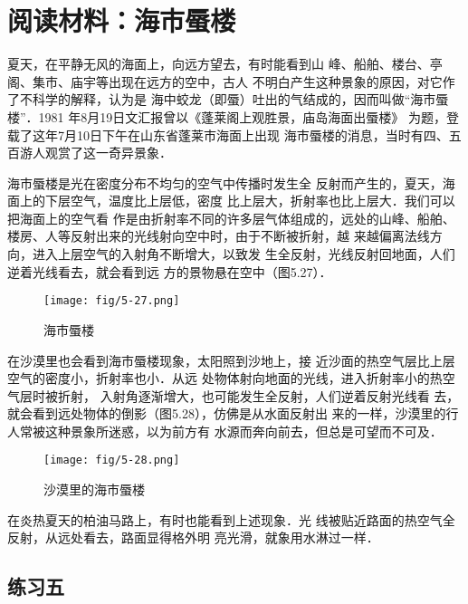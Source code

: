 \section*{阅读材料：海市蜃楼}

夏天，在平静无风的海面上，向远方望去，有时能看到山
峰、船舶、楼台、亭阁、集市、庙宇等出现在远方的空中，古人
不明白产生这种景象的原因，对它作了不科学的解释，认为是
海中蛟龙（即蜃）吐出的气结成的，因而叫做“海市蜃楼”．1981
年8月19日文汇报曾以《蓬莱阁上观胜景，庙岛海面出蜃楼》
为题，登载了这年7月10日下午在山东省蓬莱市海面上出现
海市蜃楼的消息，当时有四、五百游人观赏了这一奇异景象．

海市蜃楼是光在密度分布不均匀的空气中传播时发生全
反射而产生的，夏天，海面上的下层空气，温度比上层低，密度
比上层大，折射率也比上层大．我们可以把海面上的空气看
作是由折射率不同的许多层气体组成的，远处的山峰、船舶、
楼房、人等反射出来的光线射向空中时，由于不断被折射，越
来越偏离法线方向，进入上层空气的入射角不断增大，以致发
生全反射，光线反射回地面，人们逆着光线看去，就会看到远
方的景物悬在空中（图5.27）．
\begin{figure}[htp]\centering
    \texttt{[image: fig/5-27.png]}
    \caption{海市蜃楼}
    \end{figure}

在沙漠里也会看到海市蜃楼现象，太阳照到沙地上，接
近沙面的热空气层比上层空气的密度小，折射率也小．从远
处物体射向地面的光线，进入折射率小的热空气层时被折射，
入射角逐渐增大，也可能发生全反射，人们逆着反射光线看
去，就会看到远处物体的倒影（图5.28），仿佛是从水面反射出
来的一样，沙漠里的行人常被这种景象所迷惑，以为前方有
水源而奔向前去，但总是可望而不可及．
\begin{figure}[htp]\centering
    \texttt{[image: fig/5-28.png]}
    \caption{沙漠里的海市蜃楼}
    \end{figure}

在炎热夏天的柏油马路上，有时也能看到上述现象．光
线被贴近路面的热空气全反射，从远处看去，路面显得格外明
亮光滑，就象用水淋过一样．

\subsection*{练习五}

